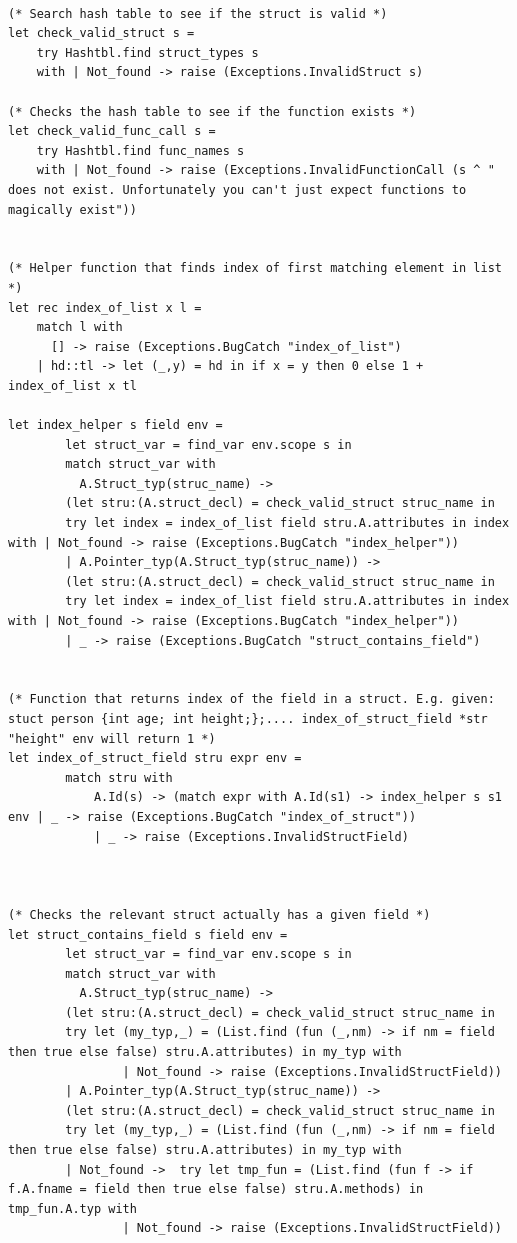 \documentclass{article}
\begin{document}
\begin{lstlisting}
     
(* Search hash table to see if the struct is valid *)
let check_valid_struct s =
	try Hashtbl.find struct_types s
	with | Not_found -> raise (Exceptions.InvalidStruct s)

(* Checks the hash table to see if the function exists *)
let check_valid_func_call s = 
	try Hashtbl.find func_names s
	with | Not_found -> raise (Exceptions.InvalidFunctionCall (s ^ " does not exist. Unfortunately you can't just expect functions to magically exist"))


(* Helper function that finds index of first matching element in list *)
let rec index_of_list x l = 
	match l with
	  [] -> raise (Exceptions.BugCatch "index_of_list")
	| hd::tl -> let (_,y) = hd in if x = y then 0 else 1 + index_of_list x tl

let index_helper s field env = 
		let struct_var = find_var env.scope s in 
		match struct_var with 
		  A.Struct_typ(struc_name) ->
		(let stru:(A.struct_decl) = check_valid_struct struc_name in 
		try let index = index_of_list field stru.A.attributes in index with | Not_found -> raise (Exceptions.BugCatch "index_helper"))
		| A.Pointer_typ(A.Struct_typ(struc_name)) ->
		(let stru:(A.struct_decl) = check_valid_struct struc_name in 
		try let index = index_of_list field stru.A.attributes in index with | Not_found -> raise (Exceptions.BugCatch "index_helper"))
		| _ -> raise (Exceptions.BugCatch "struct_contains_field")


(* Function that returns index of the field in a struct. E.g. given: stuct person {int age; int height;};.... index_of_struct_field *str "height" env will return 1 *)
let index_of_struct_field stru expr env = 	
		match stru with
	  		A.Id(s) -> (match expr with A.Id(s1) -> index_helper s s1 env | _ -> raise (Exceptions.BugCatch "index_of_struct")) 
			| _ -> raise (Exceptions.InvalidStructField)



(* Checks the relevant struct actually has a given field *)
let struct_contains_field s field env = 
		let struct_var = find_var env.scope s in 
		match struct_var with 
		  A.Struct_typ(struc_name) ->
		(let stru:(A.struct_decl) = check_valid_struct struc_name in 
		try let (my_typ,_) = (List.find (fun (_,nm) -> if nm = field then true else false) stru.A.attributes) in my_typ with 
				| Not_found -> raise (Exceptions.InvalidStructField))
		| A.Pointer_typ(A.Struct_typ(struc_name)) ->
		(let stru:(A.struct_decl) = check_valid_struct struc_name in 
		try let (my_typ,_) = (List.find (fun (_,nm) -> if nm = field then true else false) stru.A.attributes) in my_typ with 
		| Not_found ->  try let tmp_fun = (List.find (fun f -> if f.A.fname = field then true else false) stru.A.methods) in  tmp_fun.A.typ with 
				| Not_found -> raise (Exceptions.InvalidStructField))


\end{lstlisting}
\end{document}
